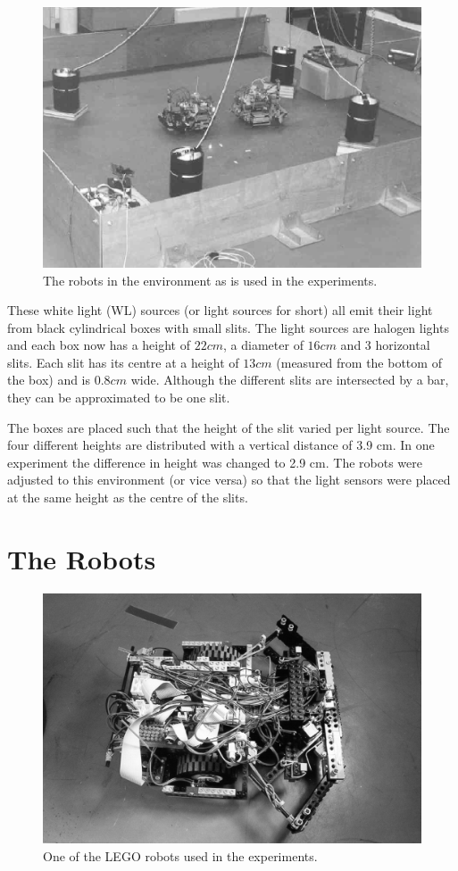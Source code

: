 \begin{figure}[t]
\centerline{\includegraphics[width=\textwidth]{robots//environment.eps}}
\caption{The robots in the environment as is used in the experiments.}
\label{f:robots:envir}
\end{figure}


These white light (WL) sources (or light sources for short) all emit their light from black cylindrical boxes with  small slits. The light sources are halogen lights and each box now has a height of $22 cm$, a diameter of $16 cm$ and 3 horizontal slits. Each slit has its centre at a height of $13 cm$ (measured from the bottom of the box) and is $0.8 cm$ wide. Although the different slits are intersected by a bar, they can be approximated to be one slit.

The boxes are placed such that the height of the slit varied per light source. The four different heights are distributed with a vertical distance of 3.9 cm. In one experiment the difference in height was changed to 2.9 cm. The robots were adjusted to this environment (or vice versa) so that the light sensors were placed at the same height as the centre of the slits.

\section{The Robots}\label{s:robots:robots}

\begin{figure}[t]
\centerline{\includegraphics[width=12cm]{robots//robot.eps}}
\caption{One of the LEGO robots used in the experiments.}
\label{f:robots}
\end{figure}

